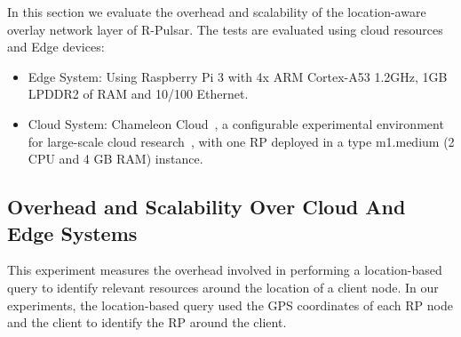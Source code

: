 
In this section we evaluate the overhead and scalability of the location-aware overlay network layer of R-Pulsar. The tests are evaluated using cloud resources and Edge devices:

\begin{itemize}
\item Edge System: Using Raspberry Pi 3 with 4x ARM Cortex-A53 1.2GHz, 1GB LPDDR2 of RAM and 10/100 Ethernet.
\item Cloud System: Chameleon Cloud~\cite{chameleon}, a configurable experimental environment for large-scale cloud research~\cite{chameleon}, with one RP deployed in a type m1.medium (2 CPU and 4 GB RAM) instance.
\end{itemize}

\subsection{Overhead and Scalability Over Cloud And Edge Systems}

This experiment measures the overhead involved in performing a location-based query to identify relevant resources around the location of a client node. In our experiments, the location-based query used the GPS coordinates of each RP node and the client to identify the RP around the client.

